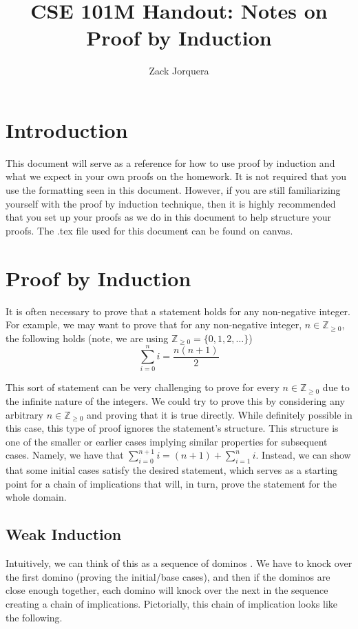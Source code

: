 \documentclass{article}
\title{CSE 101M Handout: Notes on Proof by Induction}
\author{Zack Jorquera}
\newcommand{\ZZ}{\mathbb{Z}_{\geq 0}}
\theoremstyle{plain}
\theoremstyle{definition}
\begin{document}
\maketitle

\section{Introduction}

This document will serve as a reference for how to use proof by induction and what we expect in your own proofs on the homework. It is not required that you use the formatting seen in this document. However, if you are still familiarizing yourself with the proof by induction technique, then it is highly recommended that you set up your proofs as we do in this document to help structure your proofs. The .tex file used for this document can be found on canvas.

\section{Proof by Induction}

It is often necessary to prove that a statement holds for any non-negative integer. For example, we may want to prove that for any non-negative integer, \(n \in \ZZ\), the following holds (note, we are using \(\ZZ = \{0, 1, 2, \dotsc\}\))
\[\sum_{i=0}^n i = \frac{n(n+1)}{2}\]

This sort of statement can be very challenging to prove for every \(n \in \ZZ\) due to the infinite nature of the integers. We could try to prove this by considering any arbitrary \(n \in \ZZ\) and proving that it is true directly. While definitely possible in this case, this type of proof ignores the statement's structure. This structure is one of the smaller or earlier cases implying similar properties for subsequent cases. Namely, we have that \(\sum_{i=0}^{n+1} i = (n+1) + \sum_{i=1}^n i\). Instead, we can show that some initial cases satisfy the desired statement, which serves as a starting point for a chain of implications that will, in turn, prove the statement for the whole domain.

\subsection{Weak Induction}

Intuitively, we can think of this as a sequence of dominos \cite{hammack_book_2019}. We have to knock over the first domino (proving the initial/base cases), and then if the dominos are close enough together, each domino will knock over the next in the sequence creating a chain of implications.
Pictorially, this chain of implication looks like the following.
\end{document}
